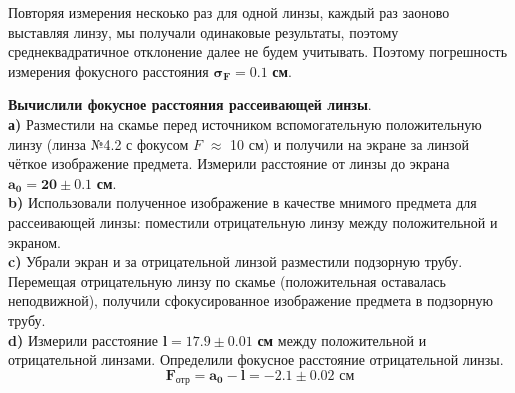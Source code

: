 \indent Повторяя измерения нескоько раз для одной линзы, каждый раз заоново выставляя линзу, мы получали одинаковые результаты, поэтому среднеквадратичное отклонение далее не будем учитывать. Поэтому погрешность измерения фокусного расстояния $\bm{\sigma_F = 0.1}$ \textbf{см}.

\indent \textbf{Вычислили фокусное расстояния рассеивающей линзы}.\\
\textbf{а)} Разместили на скамье перед источником вспомогательную положительную линзу (линза №4.2 с фокусом $F$ $\approx$ 10 см) и получили на экране за линзой чёткое изображение предмета. Измерили расстояние от линзы до экрана $\bm{a_0 = 20\pm0.1 }$ \textbf{см}. \\
\textbf{b)} Использовали полученное изображение в качестве мнимого предмета для рассеивающей линзы: поместили отрицательную линзу между положительной и экраном. \\
\textbf{c)} Убрали экран и за отрицательной линзой разместили подзорную трубу. Перемещая отрицательную линзу по скамье (положительная оставалась неподвижной), получили сфокусированное изображение предмета в подзорную трубу. \\
\textbf{d)} Измерили расстояние $\bm{l = 17.9 \pm 0.01 }$\textbf{ см} между положительной и отрицательной линзами. Определили фокусное расстояние отрицательной линзы. \\
\begin{equation}
    \bm{F_{\text{отр}} = a_0 - l = -2.1 \pm 0.02} \textbf{ см}
\end{equation}

